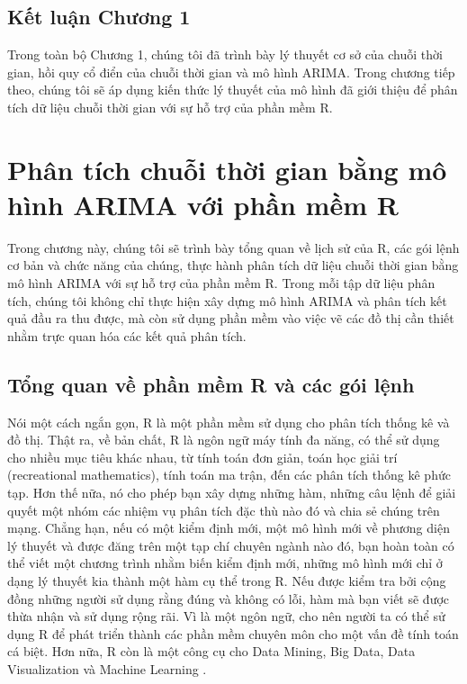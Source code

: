 \documentclass[12pt, a4paper,oneside]{book}
\theoremstyle{definition}
\begin{document}
\section*{Kết luận Chương 1}
Trong toàn bộ Chương 1, chúng tôi đã trình bày lý thuyết cơ sở của chuỗi thời gian, hồi quy cổ điển của chuỗi thời gian và mô hình ARIMA. Trong chương tiếp theo, chúng tôi sẽ áp dụng kiến thức lý thuyết của mô hình đã giới thiệu để phân tích dữ liệu chuỗi thời gian với sự hỗ trợ của phần mềm R.
	
\chapter{Phân tích chuỗi thời gian bằng mô hình ARIMA với phần mềm R}
Trong chương này, chúng tôi sẽ trình bày tổng quan về lịch sử của R, các gói lệnh cơ bản và chức năng của chúng, thực hành phân tích dữ liệu chuỗi thời gian bằng mô hình ARIMA với sự hỗ trợ của phần mềm R. Trong mỗi tập dữ liệu phân tích, chúng tôi không chỉ thực hiện xây dựng mô hình ARIMA và phân tích kết quả đầu ra thu được, mà còn sử dụng phần mềm vào việc vẽ các đồ thị cần thiết nhằm trực quan hóa các kết quả phân tích. 
\section{Tổng quan về phần mềm R và các gói lệnh}
Nói một cách ngắn gọn, R là một phần mềm sử dụng cho phân tích thống kê và đồ thị. Thật ra, về bản chất, R là ngôn ngữ máy tính đa năng, có thể sử dụng cho nhiều mục tiêu khác nhau, từ tính toán đơn giản, toán học giải trí (recreational mathematics), tính toán ma trận, đến các phân tích thống kê phức tạp. Hơn thế nữa, nó cho phép bạn xây dựng những hàm, những câu lệnh để giải quyết một nhóm các nhiệm vụ phân tích đặc thù nào đó và chia sẻ chúng trên mạng. Chẳng hạn, nếu có một kiểm định mới, một mô hình mới về phương diện lý thuyết và được đăng trên một tạp chí chuyên ngành nào đó, bạn hoàn toàn có thể viết một chương trình nhằm biến kiểm định mới, những mô hình mới chỉ ở dạng lý thuyết kia thành một hàm cụ thể trong R. Nếu được kiểm tra bởi cộng đồng những người sử dụng rằng đúng và không có lỗi, hàm mà bạn viết sẽ được thừa nhận và sử dụng rộng rãi. Vì là một ngôn ngữ, cho nên người ta có thể sử dụng R để phát triển thành các phần mềm chuyên môn cho một vấn đề tính toán cá biệt. Hơn nữa, R còn là một công cụ cho Data Mining, Big Data, Data Visualization và Machine Learning \cite{6, 7}.
\end{document}

